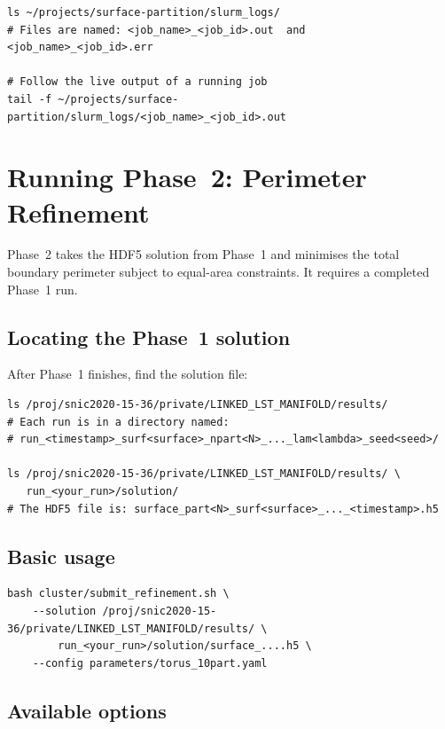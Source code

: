 \documentclass[11pt,a4paper]{article}
\begin{document}
\begin{lstlisting}[style=shell]
ls ~/projects/surface-partition/slurm_logs/
# Files are named: <job_name>_<job_id>.out  and  <job_name>_<job_id>.err

# Follow the live output of a running job
tail -f ~/projects/surface-partition/slurm_logs/<job_name>_<job_id>.out
\end{lstlisting}

\section{Running Phase~2: Perimeter Refinement}

Phase~2 takes the HDF5 solution from Phase~1 and minimises the total
boundary perimeter subject to equal-area constraints.  It requires a
completed Phase~1 run.

\subsection{Locating the Phase~1 solution}

After Phase~1 finishes, find the solution file:

\begin{lstlisting}[style=shell]
ls /proj/snic2020-15-36/private/LINKED_LST_MANIFOLD/results/
# Each run is in a directory named:
# run_<timestamp>_surf<surface>_npart<N>_..._lam<lambda>_seed<seed>/

ls /proj/snic2020-15-36/private/LINKED_LST_MANIFOLD/results/ \
   run_<your_run>/solution/
# The HDF5 file is: surface_part<N>_surf<surface>_..._<timestamp>.h5
\end{lstlisting}

\subsection{Basic usage}

\begin{lstlisting}[style=shell]
bash cluster/submit_refinement.sh \
    --solution /proj/snic2020-15-36/private/LINKED_LST_MANIFOLD/results/ \
        run_<your_run>/solution/surface_....h5 \
    --config parameters/torus_10part.yaml
\end{lstlisting}

\subsection{Available options}
\end{document}
